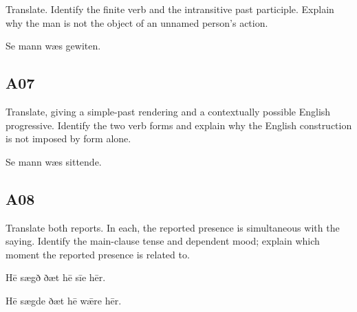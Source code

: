 \par\begin{minipage}{\linewidth}\raggedright
Translate. Identify the finite verb and the intransitive past participle. Explain why the man is not the object of an unnamed person’s action.

Se mann wæs gewiten.

\end{minipage}\par\addvspace{4pt}

\subsection*{A07}

\par\begin{minipage}{\linewidth}\raggedright
Translate, giving a simple-past rendering and a contextually possible English progressive. Identify the two verb forms and explain why the English construction is not imposed by form alone.

Se mann wæs sittende.

\end{minipage}\par\addvspace{4pt}

\subsection*{A08}

\par\begin{minipage}{\linewidth}\raggedright
Translate both reports. In each, the reported presence is simultaneous with the saying. Identify the main-clause tense and dependent mood; explain which moment the reported presence is related to.

Hē sægð ðæt hē sīe hēr.

Hē sægde ðæt hē wǣre hēr.

\end{minipage}\par\addvspace{4pt}

